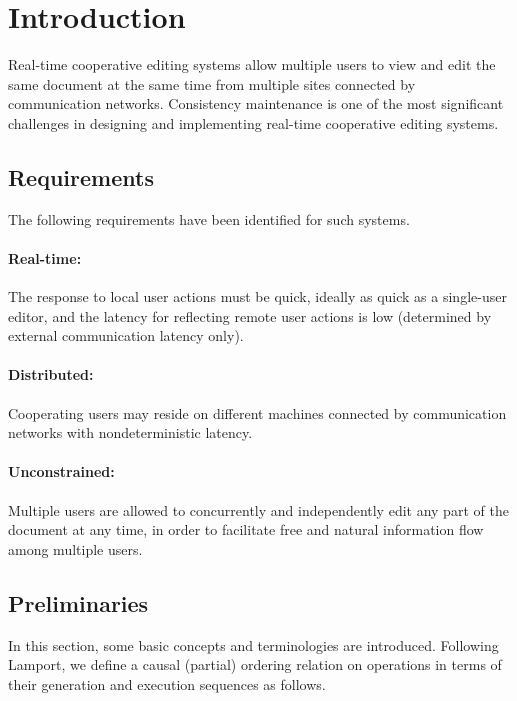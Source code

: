 \documentclass[11pt,a4paper]{article}
\begin{document}
\setlength{\parindent}{0pt}

\newtheorem{defn}{Definition}




\newpage

\tableofcontents
\newpage
\listoftables
\listoffigures
\newpage



\newpage


\section{Introduction}
Real-time cooperative editing systems allow multiple users to view and edit the same document at the same time from multiple sites connected by communication networks. Consistency maintenance is one of the most significant challenges in designing and implementing real-time cooperative editing systems. 


\subsection{Requirements}
The following requirements have been identified for such systems.

\paragraph{Real-time:} The response to local user actions must be quick, ideally as quick as a single-user editor, and the latency for reflecting remote user actions is low (determined by external communication latency only). 

\paragraph{Distributed:} Cooperating users may reside on different machines connected by communication networks with nondeterministic latency.

\paragraph{Unconstrained:} Multiple users are allowed to concurrently and independently edit any part of the document at any time, in order to facilitate free and natural information flow among multiple users.


\subsection{Preliminaries}
In this section, some basic concepts and terminologies are introduced. Following Lamport\cite{lamport78}, we define a causal (partial) ordering relation on operations in terms of their generation and execution sequences as follows.
\end{document}
